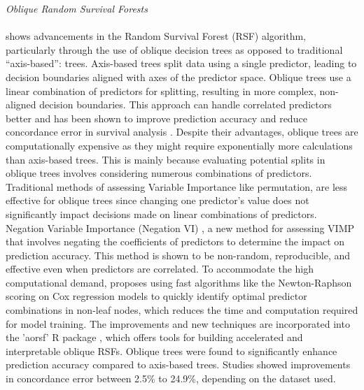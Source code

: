 \noindent \textit{Oblique Random Survival Forests}
\\\\
\noindent \parencite{jaeger_accelerated_2022} shows advancements in the Random Survival Forest (RSF) algorithm, particularly through the use of oblique decision trees as opposed to traditional “axis-based”: trees. \parencite{jaeger_accelerated_2022} Axis-based trees split data using a single predictor, leading to decision boundaries aligned with axes of the predictor space. Oblique trees use a linear combination of predictors for splitting, resulting in more complex, non-aligned decision boundaries. This approach can handle correlated predictors better and has been shown to improve prediction accuracy and reduce concordance error in survival analysis \parencite{jaeger_accelerated_2022}. Despite their advantages, oblique trees are computationally expensive as they might require exponentially more calculations than axis-based trees. This is mainly because evaluating potential splits in oblique trees involves considering numerous combinations of predictors. Traditional methods of assessing Variable Importance \parencite{pham_springer_2023} like permutation, are less effective for oblique trees since changing one predictor's value does not significantly impact decisions made on linear combinations of predictors. Negation Variable Importance (Negation VI) \parencite{jaeger_accelerated_2022}, a new method for assessing VIMP that involves negating the coefficients of predictors to determine the impact on prediction accuracy. This method is shown to be non-random, reproducible, and effective even when predictors are correlated. To accommodate the high computational demand, \parencite{jaeger_accelerated_2022} proposes using fast algorithms like the Newton-Raphson scoring on Cox regression models to quickly identify optimal predictor combinations in non-leaf nodes, which reduces the time and computation required for model training. The improvements and new techniques are incorporated into the 'aorsf' R package \parencite{jaeger_accelerated_2022}, which offers tools for building accelerated and interpretable oblique RSFs. Oblique trees were found to significantly enhance prediction accuracy compared to axis-based trees. Studies showed improvements in concordance error between 2.5\% to 24.9\%, depending on the dataset used.

